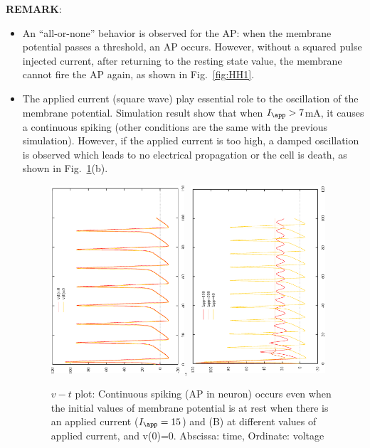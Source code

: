 {\bf REMARK}:
\begin{itemize}

\item An  ``all-or-none'' behavior is observed for the AP: when the
  membrane potential passes a threshold, an AP occurs. However, without a
  squared pulse injected current, after returning to the resting state
  value, the membrane cannot fire the AP again, as shown in
  Fig.~\ref{fig:HH1}.

\item The applied current (square wave) play essential role to the
  oscillation of the membrane potential. Simulation result show that
  when $I_\app>7$mA, it causes a continuous spiking (other
  conditions are the same with the previous simulation). However, if
  the applied current is too high, a damped oscillation is observed
  which leads to no electrical propagation or the cell is death, as
  shown in Fig.~\ref{fig:HH2}(b).

  \begin{figure}[!hbt]
    \centerline{\includegraphics[height=7cm,angle=-90]{./images/HH_model2.eps},
      \includegraphics[height=7cm, angle=-90]{./images/HH_model3.eps}}
    \caption{$v-t$ plot: Continuous spiking (AP in neuron) occurs even when
    the initial values of membrane potential is at rest when there is an applied
      current ($I_\app=15$) and (B) at different values of applied current, and
      v(0)=0. Abscissa: time, Ordinate: voltage}
    \label{fig:HH2}
  \end{figure}


\end{itemize}
